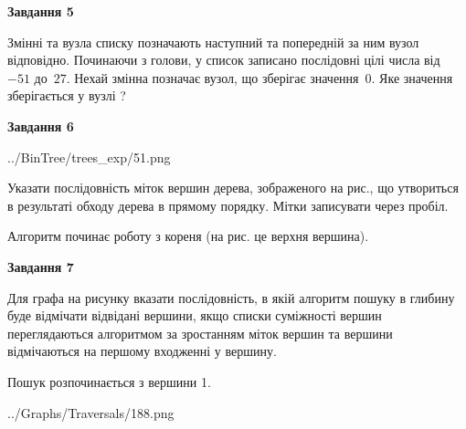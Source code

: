 \documentclass[12pt, ukrainian]{article}
\begin{document}
{\begin {large}
{\begin {center}\textbf{Завдання 5}\end {center}}\par
Змінні  та  вузла списку позначають наступний та попередній за ним вузол відповідно. Починаючи з голови, у список записано послідовні цілі числа від~$-51$ до~$27$. Нехай змінна  позначає вузол, що зберігає значення~$0$.
Яке значення зберігається у вузлі  ?\par
\newpage

{\begin {center}\textbf{Завдання 6}\end {center}}\par

\begin{center}
	{../BinTree/trees_exp/51.png}
\end{center}
Указати послідовність міток вершин дерева, зображеного на рис., що утвориться в результаті обходу дерева в прямому порядку. Мітки записувати через пробіл.\par Алгоритм починає роботу з кореня (на рис. це верхня вершина).\par
\newpage

{\begin {center}\textbf{Завдання 7}\end {center}}\par
Для графа на рисунку вказати послідовність, в якій алгоритм пошуку в глибину буде відмічати відвідані вершини, якщо списки суміжності вершин переглядаються алгоритмом за зростанням міток вершин та вершини відмічаються на першому вход\-женні у вершину.\par
Пошук розпочинається з вершини 1.\par

\begin{center}
	{../Graphs/Traversals/188.png}
\end{center}\par
\newpage


\end{large}}
\end{document}
